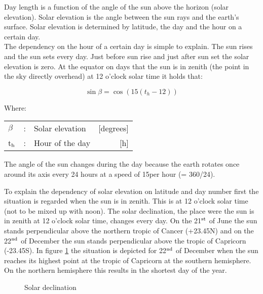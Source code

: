 Day length is a function of the angle of the sun above the horizon (solar elevation). Solar
elevation is the angle between the sun rays and the earth's surface. Solar elevation is
determined by latitude, the day and the hour on a certain day. \\
The dependency on the hour of a certain day is simple to explain. The sun rises and the
sun sets every day. Just before sun rise and just after sun set the solar elevation is zero. At the equator on days that the sun is in zenith (the point in the sky directly overhead) at 12 o'clock solar time it holds that:

\begin{equation}
\sin \beta = \cos (15(t _{h} -12))
\end{equation}

Where:\\
\begin{tabularx}{\textwidth}{llXr}
$\beta$ &:& Solar elevation  & [degrees]\\
t$_{{\rm h}}$ &:& Hour of the day  & [h]\\
\end{tabularx}

The angle of the sun changes during the day because the earth rotates once around its axis
every 24 hours at a speed of 15\degrees  per hour (= 360/24).  

To explain the dependency of solar elevation on latitude and day number first the situation
is regarded when the sun is in zenith. This is at 12 o'clock solar time (not to be mixed up
with noon). The solar declination, the place were the sun is in zenith at 12 o'clock solar
time, changes every day. On the 21$^{\rm st}$ of June the sun stands perpen\-dicular above the northern tropic of Cancer (+23.45\degrees N) and on the 22$^{\rm nd}$ of December the sun stands perpendicular above the tropic of Capricorn (-23.45\degrees S). In figure \ref{fig:solardecl} the situation is depicted for 22$^{\rm nd}$ of December when the sun reaches its highest point at the tropic of Capricorn at the southern hemisphere. On the northern hemisphere this results in the shortest day of the year. \\

\begin{figure}[htbp]
\caption{Solar declination}
\label{fig:solardecl}
\begin{forcewidth}{9.33cm}
 \begin{center} \end{center}
\end{forcewidth}
\end{figure}

